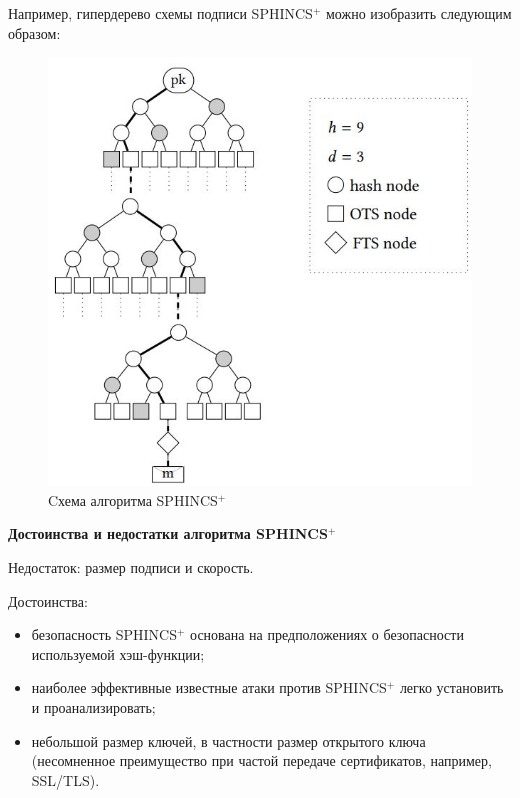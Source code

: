 Например, гипердерево схемы подписи SPHINCS$^+$ можно изобразить следующим образом:

\begin{figure}[H]
\centering
\includegraphics[scale=0.8]{images/sphincs+.JPG}
\caption{Cхема алгоритма SPHINCS$^+$ \cite{sphincs_scheme}}
\end{figure}

\textbf{Достоинства и недостатки алгоритма SPHINCS$^+$ }\cite{doc_sphincs}

Недостаток: размер подписи и скорость.

Достоинства: 
\begin{itemize}
\item 
безопасность SPHINCS$^+$ основана на
предположениях о безопасности используемой хэш-функции;
\item
наиболее эффективные известные атаки против SPHINCS$^+$ легко установить и проанализировать;
\item
небольшой размер ключей, в частности размер открытого ключа (несомненное преимущество при частой передаче сертификатов, например, SSL/TLS).
\end{itemize}